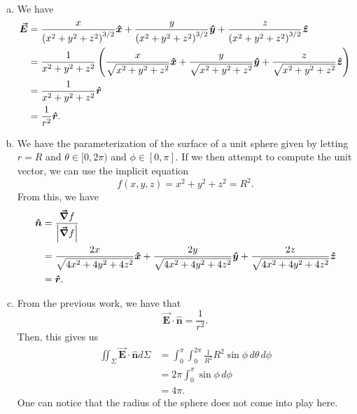 \documentclass[12pt]{article} %
\newcommand{\grad}{\boldsymbol{\vec{\nabla}}}
\newcommand{\vecfieldE}{\boldsymbol{\vec{E}}}
\newcommand{\rhat}{\boldsymbol{\hat{r}}}
\newcommand{\unitvec}{\boldsymbol{\hat{n}}}
\begin{document}
\begin{solution}~
\begin{enumerate}[(a)]
    \item We have
    \begin{align*}
    \vecfieldE &= \frac{x}{\left(x^2+y^2+z^2\right)^{3/2}} \xhat + \frac{y}{\left(x^2+y^2+z^2\right)^{3/2}} \yhat + \frac{z}{\left(x^2+y^2+z^2\right)^{3/2}} \zhat\\
     &= \frac{1}{x^2+y^2+z^2} \left( \frac{x}{\sqrt{x^2+y^2+z^2}} \xhat + \frac{y}{\sqrt{x^2+y^2+z^2}} \yhat + \frac{z}{\sqrt{x^2+y^2+z^2}} \zhat\right)\\
     &= \frac{1}{x^2+y^2+z^2} \rhat\\
     &= \frac{1}{r^2} \rhat.
    \end{align*}
    \item We have the parameterization of the surface of a unit sphere given by letting $r=R$ and $\theta \in [0,2\pi)$ and $\phi \in [0,\pi]$.  If we then attempt to compute the unit vector, we can use the implicit equation 
    \[
    f(x,y,z)=x^2+y^2+z^2=R^2.
    \]
    From this, we have
    \begin{align*}
        \unitvec &= \frac{\grad f}{\left| \grad f \right|} \\
        &= \frac{2x}{\sqrt{4x^2+4y^2+4z^2}}\xhat + \frac{2y}{\sqrt{4x^2+4y^2+4z^2}}\yhat + \frac{2z}{\sqrt{4x^2+4y^2+4z^2}}\zhat\\
        &= \rhat.
    \end{align*}
    \item From the previous work, we have that
    \[
    \vecfieldE \cdot \unitvec = \frac{1}{r^2}.  
    \]
    Then, this gives us
    \begin{align*}
        \iint_{\Sigma} \vecfieldE \cdot \unitvec d\Sigma &= \int_0^\pi \int_0^{2\pi} \frac{1}{R^2} R^2 \sin \phi  \, d\theta \, d\phi \\
        &= 2\pi \int_0^\pi \sin \phi \, d \phi\\
        &= 4 \pi.  
    \end{align*}
    One can notice that the radius of the sphere does not come into play here.
\end{enumerate} 
\end{solution}
\end{document}

